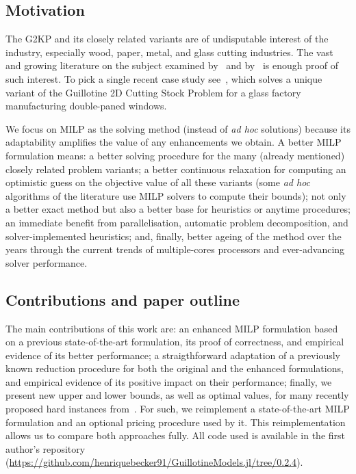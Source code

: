 \documentclass[smallextended]{svjour3}       %
\begin{document}
\subsection{Motivation}

The G2KP and its closely related variants are of undisputable interest of the industry, especially wood, paper, metal, and glass cutting industries.
The vast and growing literature on the subject examined by~\cite{iori:2020} and by~\cite{russo:2020} is enough proof of such interest.
To pick a single recent case study see~\cite{clautiaux:2019}, which solves a unique variant of the Guillotine 2D Cutting Stock Problem for a glass factory manufacturing double-paned windows.

We focus on MILP as the solving method (instead of \emph{ad hoc} solutions) because its adaptability amplifies the value of any enhancements we obtain.
A better MILP formulation means:
a better solving procedure for the many (already mentioned) closely related problem variants;
a better continuous relaxation for computing an optimistic guess on the objective value of all these variants (some \emph{ad hoc} algorithms of the literature use MILP solvers to compute their bounds);
not only a better exact method but also a better base for heuristics or anytime procedures;
an immediate benefit from parallelisation, automatic problem decomposition, and solver-implemented heuristics;
and, finally, better ageing of the method over the years through the current trends of multiple-cores processors and ever-advancing solver performance.

\subsection{Contributions and paper outline}

The main contributions of this work are:
an enhanced MILP formulation based on a previous state-of-the-art formulation, its proof of correctness, and empirical evidence of its better performance;
a straigthforward adaptation of a previously known reduction procedure for both the original and the enhanced formulations, and empirical evidence of its positive impact on their performance;
finally, we present new upper and lower bounds, as well as optimal values, for many recently proposed hard instances from~\cite{velasco:2019}.
For such, we reimplement a state-of-the-art MILP formulation and an optional pricing procedure used by it.
This reimplementation allows us to compare both approaches fully.
All code used is available in the first author's repository ({\small\url{https://github.com/henriquebecker91/GuillotineModels.jl/tree/0.2.4}}).
\end{document}
